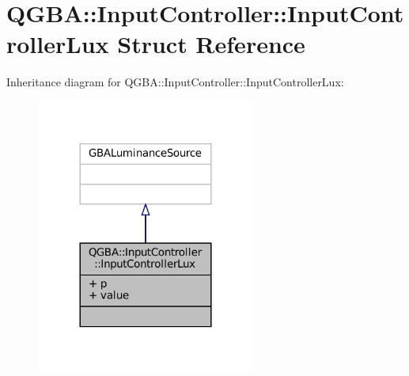 \hypertarget{struct_q_g_b_a_1_1_input_controller_1_1_input_controller_lux}{}\section{Q\+G\+BA\+:\+:Input\+Controller\+:\+:Input\+Controller\+Lux Struct Reference}
\label{struct_q_g_b_a_1_1_input_controller_1_1_input_controller_lux}


Inheritance diagram for Q\+G\+BA\+:\+:Input\+Controller\+:\+:Input\+Controller\+Lux\+:
\nopagebreak
\begin{figure}[H]
\begin{center}
\leavevmode
\includegraphics[width=204pt]{struct_q_g_b_a_1_1_input_controller_1_1_input_controller_lux__inherit__graph}
\end{center}
\end{figure}


